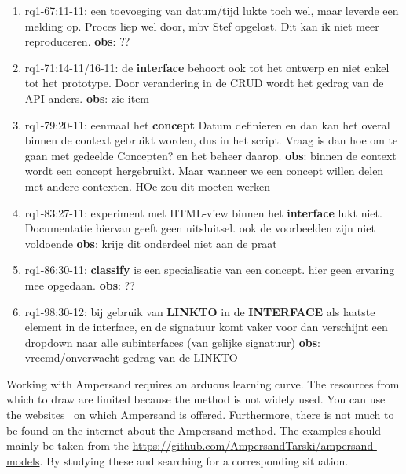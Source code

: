 \begin{enumerate}
    \item rq1-67:11-11: een toevoeging van datum/tijd lukte toch wel, maar leverde  een melding op. Proces liep wel door, mbv Stef opgelost. Dit kan ik niet meer reproduceren.
    \newline\textbf{obs}: ??
    
    \item rq1-71:14-11/16-11: de \textbf{interface} behoort ook tot het ontwerp en niet enkel tot het prototype. Door verandering in de CRUD wordt het gedrag van de API anders.
    \newline\textbf{obs}: zie item
    
    \item rq1-79:20-11: eenmaal het \textbf{concept} Datum definieren en dan kan het overal binnen de context gebruikt worden, dus in het script.
    Vraag is dan hoe om te gaan met gedeelde Concepten? en het beheer daarop.
    \newline\textbf{obs}: binnen de context wordt een concept hergebruikt.
    Maar wanneer we een concept willen delen met andere contexten. HOe zou dit moeten werken
    
    \item rq1-83:27-11: experiment met HTML-view binnen het \textbf{interface} lukt niet. 
    Documentatie hiervan geeft geen uitsluitsel. 
    ook de voorbeelden zijn niet voldoende 
    \newline\textbf{obs}: krijg dit onderdeel niet aan de praat
    
    \item rq1-86:30-11: \textbf{classify} is een specialisatie van een concept. hier geen ervaring mee opgedaan.
    \newline\textbf{obs}: ??
    
    \item rq1-98:30-12: bij gebruik van \textbf{LINKTO} in de \textbf{INTERFACE} als laatste element in de interface, en de signatuur komt vaker voor dan verschijnt een dropdown naar alle subinterfaces (van gelijke signatuur)
    \newline\textbf{obs}: vreemd/onverwacht gedrag van de LINKTO
    
\end{enumerate}

Working with Ampersand requires an arduous learning curve.
The resources from which to draw are limited because the method is not widely used.
You can use the websites~\footnotemark{} on which Ampersand is offered.
Furthermore, there is not much to be found on the internet about the Ampersand method.
The examples should mainly be taken from the \url{https://github.com/AmpersandTarski/ampersand-models}.
By studying these and searching for a corresponding situation.

